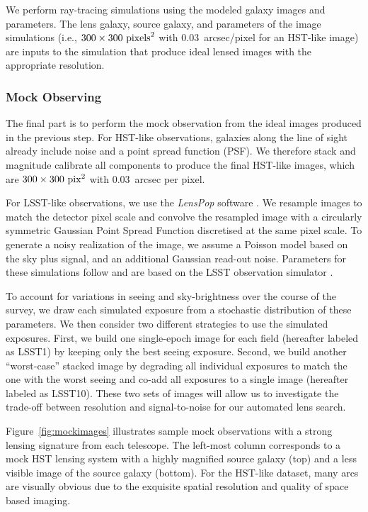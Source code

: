 \documentclass{emulateapj}
\begin{document}
We perform ray-tracing simulations using the modeled galaxy images and
parameters.  The lens galaxy, source galaxy, and parameters of the
image simulations (i.e., $300 \times 300~{\rm pixels}^2$ with
0.03~arcsec/pixel for an HST-like image) are inputs to the simulation
that produce ideal lensed images with the appropriate resolution.

\subsubsection{Mock Observing}

The final part is to perform the mock observation from the ideal
images produced in the previous step. For HST-like observations,
galaxies along the line of sight already include noise and a point
spread function (PSF).  We therefore stack and magnitude calibrate all
components to produce the final HST-like images, which are
$300\times300~{\rm pix}^2$ with $0.03$~arcsec per pixel.

For LSST-like observations, we use the {\em LensPop} software
\citep{collett_15}.  We resample images to match the detector pixel
scale and convolve the resampled image with a circularly symmetric
Gaussian Point Spread Function discretised at the same pixel scale. To
generate a noisy realization of the image, we assume a Poisson model
based on the sky plus signal, and an additional Gaussian read-out
noise. Parameters for these simulations follow \citet{collett_15} and
are based on the LSST observation simulator \citep{connolly_etal10}.

To account for variations in seeing and sky-brightness over the course
of the survey, we draw each simulated exposure from a stochastic
distribution of these parameters. We then consider two different
strategies to use the simulated exposures. First, we build one
single-epoch image for each field (hereafter labeled as LSST1) by
keeping only the best seeing exposure.  Second, we build another
``worst-case'' stacked image by degrading all individual exposures to
match the one with the worst seeing and co-add all exposures to a
single image (hereafter labeled as LSST10).  These two sets of images
will allow us to investigate the trade-off between resolution and
signal-to-noise for our automated lens search.

Figure~\ref{fig:mockimages} illustrates sample mock observations with
a strong lensing signature from each telescope.  The left-most column
corresponds to a mock HST lensing system with a highly magnified
source galaxy (top) and a less visible image of the source galaxy
(bottom). For the HST-like dataset, many arcs are visually obvious due
to the exquisite spatial resolution and quality of space based
imaging.
\end{document}
